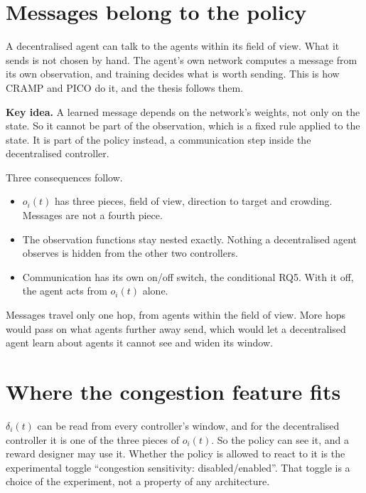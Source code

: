 \documentclass[11pt,a4paper]{article}
\newcommand{\idea}[1]{\par\smallskip\noindent\colorbox{boxbg}{\parbox{\dimexpr\linewidth-2\fboxsep}{\textbf{Key idea.} #1}}\par\smallskip}
\begin{document}
\section{Messages belong to the policy}
\label{sec:guide-messages}

A decentralised agent can talk to the agents within its field of view.
What it sends is not chosen by hand. The agent's own network computes a
message from its own observation, and training decides what is worth
sending. This is how CRAMP and PICO do it, and the thesis follows them.

\idea{A learned message depends on the network's weights, not only on the
state. So it cannot be part of the observation, which is a fixed rule
applied to the state. It is part of the policy instead, a communication
step inside the decentralised controller.}

\noindent Three consequences follow.
\begin{itemize}[leftmargin=*]
  \item $o_i(t)$ has three pieces, field of view, direction to target and
        crowding. Messages are not a fourth piece.
  \item The observation functions stay nested exactly. Nothing a
        decentralised agent observes is hidden from the other two
        controllers.
  \item Communication has its own on/off switch, the conditional RQ5. With
        it off, the agent acts from $o_i(t)$ alone.
\end{itemize}

\noindent Messages travel only one hop, from agents within the field of
view. More hops would pass on what agents further away send, which would
let a decentralised agent learn about agents it cannot see and widen its
window.

\section{Where the congestion feature fits}

$\delta_i(t)$ can be read from every controller's window, and for the
decentralised controller it is one of the three pieces of $o_i(t)$. So the
policy can see it, and a reward designer may use it. Whether the policy is allowed to
react to it is the experimental toggle ``congestion sensitivity:
disabled/enabled''. That toggle is a choice of the experiment, not a
property of any architecture.
\end{document}
